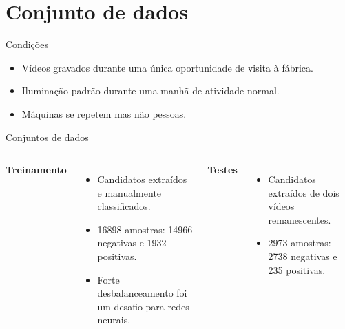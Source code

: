 \section{Conjunto de dados}

\begin{frame}{Condições}
	\begin{itemize}
	  \item Vídeos gravados durante uma única oportunidade de visita à fábrica.
		\item Iluminação padrão durante uma manhã de atividade normal.
		\item Máquinas se repetem mas não pessoas.
	\end{itemize}
\end{frame}

\begin{frame}{Conjuntos de dados}

\begin{columns}[T]
\textbf{Treinamento}
\begin{itemize}
	\item Candidatos extraídos e manualmente classificados.
	\item 16898 amostras: 14966 negativas e 1932 positivas.
	\item Forte desbalanceamento foi um desafio para redes neurais.
\end{itemize}

\textbf{Testes}
\begin{itemize}
	\item Candidatos extraídos de dois vídeos remanescentes.
	\item 2973 amostras: 2738 negativas e 235 positivas.
\end{itemize}
\end{columns}
\end{frame}
